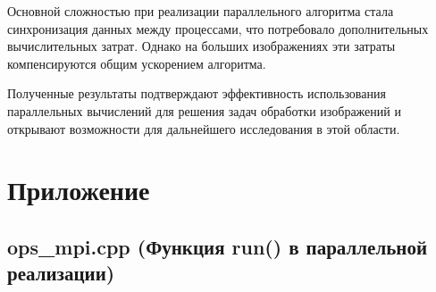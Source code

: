 \documentclass[a4paper,12pt]{article}
\begin{document}
Основной сложностью при реализации параллельного алгоритма стала синхронизация данных между процессами, что потребовало дополнительных вычислительных затрат. Однако на больших изображениях эти затраты компенсируются общим ускорением алгоритма.

Полученные результаты подтверждают эффективность использования параллельных вычислений для решения задач обработки изображений и открывают возможности для дальнейшего исследования в этой области.

\section{Приложение}
\subsection{ops\_mpi.cpp (Функция run() в параллельной реализации)}
\end{document}
